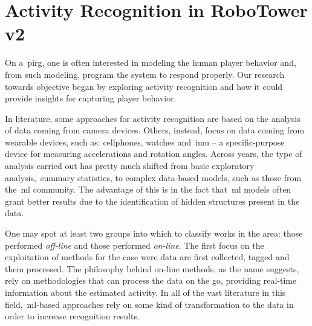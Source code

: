 \chapter{Activity Recognition in RoboTower v2}\label{ch:activity}
On a~\gls{pirg}, one is often interested in modeling the human player behavior and, from such modeling, program the system to respond properly. Our research towards objective began by exploring activity recognition and how it could provide insights for capturing player behavior. 

In literature, some approaches for activity recognition are based on the analysis of data coming from camera devices. Others, instead, focus on data coming from wearable devices, such as: cellphones, watches and~\gls{imu} -- a specific-purpose device for measuring accelerations and rotation angles. Across years, the type of analysis carried out has pretty much shifted from basic exploratory analysis,~\eg summary statistics, %
to complex data-based models, such as those from the~\gls{ml} community. The advantage of this is in the fact that~\gls{ml} models often grant better results due to the identification of hidden structures present in the data.

One may spot at least two groups into which to classify works in the area: those performed \textit{off-line} and those performed \textit{on-line}. The first focus on the exploitation of methods for the case were data are first collected, tagged and them processed. The philosophy behind on-line methods, as the name suggests, rely on methodologies that can process the data on the go, providing real-time information about the estimated activity. In all of the vast literature in this field,~\gls{ml}-based approaches rely on some kind of transformation to the data in order to increase recognition results. %



